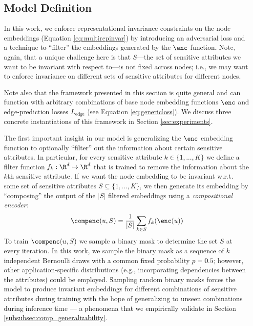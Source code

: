 
\subsection{Model Definition}

In this work, we enforce representational invariance constraints on the node embeddings (Equation \ref{eq:multirepinvar}) by introducing an adversarial loss and a technique to ``filter'' the embeddings generated by the $\enc$ function.
Note, again, that a unique challenge here is that $S$---the set of sensitive attributes we want to be invariant with respect to---is not  fixed across nodes; i.e., we may want to enforce invariance on different sets of sensitive attributes for different nodes. 

Note also that the framework presented in this section is quite general and can function with arbitrary combinations of base node embedding functions $\enc$ and edge-prediction losses $L_{\textrm{edge}}$ (see Equation \ref{eq:genericloss}).
We discuss three concrete instantiations of this framework in Section \ref{sec:experiments}.

The first important insight in our model is generalizing the $\enc$ embedding function to optionally ``filter'' out the information about certain sensitive attributes. 
In particular, for every sensitive attribute $k \in \{1, ..., K\}$ we define a filter function $f_k : \R^d \mapsto \R^d$ that is trained to remove the information about the $k$th sensitive attribute.
If we want the node embedding to be invariant w.r.t. some set of sensitive attributes $S \subseteq \{1,...,K\}$, we then generate its embedding by ``composing'' the output of the $|S|$ filtered embeddings using a {\em compositional encoder}:
\begin{equation}\label{eq:compenc}
    \compenc(u, S) = \frac{1}{|S|}\sum_{k \in S}f_k(\enc(u))
\end{equation}
To train $\compenc(u, S)$ we sample a binary mask to determine the set $S$ at every iteration. 
In this work, we sample the binary mask as a sequence of $k$ independent Bernoulli draws with a common fixed probability $p=0.5$; however, other application-specific distributions (e.g., incorporating dependencies between the attributes) could be employed.
Sampling random binary masks forces the model to produce invariant embeddings for different combinations of sensitive attributes during training with the hope of generalizing to unseen combinations during inference time --- a phenomena that we empirically validate in Section \ref{subsubsec:comp_generalizability}.

